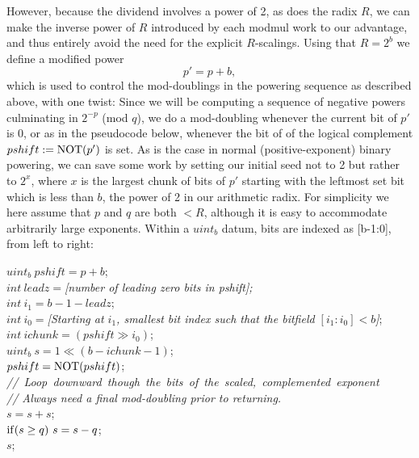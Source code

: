 \documentclass{article}
\begin{document}
However, because the dividend involves a power of 2, as does the radix $R$, we can make the inverse power of $R$ introduced by each modmul work to our advantage, and thus entirely avoid the need for the explicit $R$-scalings. Using that $R = 2^b$ we define a modified power
$$
	p' = p + b,
$$
which is used to control the mod-doublings in the powering sequence as described above, with one twist: Since we will be computing a sequence of negative powers culminating in $2^{-p}$ (mod $q$), we do a mod-doubling whenever the current bit of $p'$ is 0, or as in the pseudocode below, whenever the bit of of the logical complement $pshift := {\rm NOT}(p')$ is set. As is the case in normal (positive-exponent) binary powering, we can save some work by setting our initial seed not to 2 but rather to $2^x$, where $x$ is the largest chunk of bits of $p'$ starting with the leftmost set bit which is less than $b$, the power of 2 in our arithmetic radix. For simplicity we here assume that $p$ and $q$ are both $< R$, although it is easy to accommodate arbitrarily large exponents. Within a $uint_b$ datum, bits are indexed as [b-1:0], from left to right:
\vspace{0.1in}

\begin{algorithm}[H]
\SetAlgoLined
{}
\vspace{0.1in}
{
	$uint_b\ pshift = p + b$;\\
	$int\ leadz  = ${\em [number of leading zero bits in pshift];}\\
	$int\ i_1  = b - 1 - leadz$;\\
	$int\ i_0 = ${\em [Starting at $i_1$, smallest bit index such that the bitfield $[i_1:i_0] < b$]};\\
	$int\ ichunk = (pshift \gg i_0)$;\qquad{}\\
	$uint_b\ s = 1 \ll (b - ichunk - 1)$;\\
	$pshift = {\rm NOT}(pshift)$;\\
\vspace{0.1in}
	{\em//\ Loop\ downward\ though\ the\ bits\ of\ the\ scaled,\ complemented\ exponent}\\
	{\em// Always need a final mod-doubling prior to returning.}\\
	$s = s + s$;\\
	${\rm if}(s \ge q)\ s = s-q$;\\
	\Return $s$;
}
\caption{Computation of $2^{-p}$ (mod $q$) without any explicit radix-scalings.}
\label{algo_e}
\end{algorithm}
\vspace{0.1in}
\end{document}
